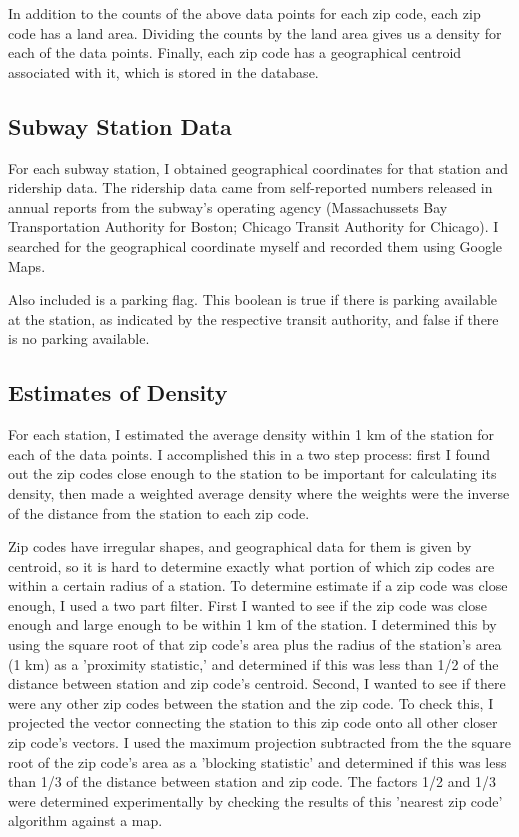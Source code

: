 \documentclass{article}
\begin{document}
In addition to the counts of the above data points for each zip code, each zip code has a land area. Dividing the counts by the land area gives us a density for each of the data points. Finally, each zip code has a geographical centroid associated with it, which is stored in the database. 

\subsection{Subway Station Data}

For each subway station, I obtained geographical coordinates for that station and ridership data. The ridership data came from self-reported numbers released in annual reports from the subway's operating agency (Massachussets Bay Transportation Authority for Boston; Chicago Transit Authority for Chicago). I searched for the geographical coordinate myself and recorded them using Google Maps. 

Also included is a parking flag. This boolean is true if there is parking available at the station, as indicated by the respective transit authority, and false if there is no parking available.

\subsection{Estimates of Density}

For each station, I estimated the average density within 1 km of the station for each of the data points. I accomplished this in a two step process: first I found out the zip codes close enough to the station to be important for calculating its density, then made a weighted average density where the weights were the inverse of the distance from the station to each zip code.

Zip codes have irregular shapes, and geographical data for them is given by centroid, so it is hard to determine exactly what portion of which zip codes are within a certain radius of a station. To determine estimate if a zip code was close enough, I used a two part filter. First I wanted to see if the zip code was close enough and large enough to be within 1 km of the station. I determined this by using the square root of that zip code's area plus the radius of the station's area (1 km) as a 'proximity statistic,' and determined if this was less than 1/2 of the distance between station and zip code's centroid. Second, I wanted to see if there were any other zip codes between the station and the zip code. To check this, I projected the vector connecting the station to this zip code onto all other closer zip code's vectors. I used the maximum projection subtracted from the the square root of the zip code's area as a 'blocking statistic' and determined if this was less than 1/3 of the distance between station and zip code. The factors 1/2 and 1/3 were determined experimentally by checking the results of this 'nearest zip code' algorithm against a map.
\end{document}
